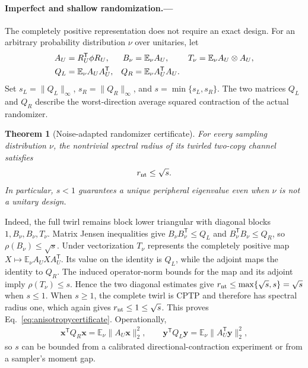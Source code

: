\documentclass[aps,prl,reprint,superscriptaddress,nofootinbib]{revtex4-2}
\newtheorem{theorem}{Theorem}
\newcommand{\E}{\mathbb{E}}
\begin{document}
\paragraph{Imperfect and shallow randomization.---}
The completely positive representation does not require an exact design.
For an arbitrary probability distribution $\nu$ over unitaries, let
\begin{align}
 A_U&=R_U^{\mathsf T}\phi R_U,&
 B_\nu&=\E_\nu A_U,&
 T_\nu&=\E_\nu A_U\otimes A_U,\notag\\
 Q_L&=\E_\nu A_UA_U^{\mathsf T},&
 Q_R&=\E_\nu A_U^{\mathsf T}A_U.
 \label{eq:arbitrarysampler}
\end{align}
Set $s_L=\lVert Q_L\rVert_\infty$, $s_R=\lVert Q_R\rVert_\infty$, and
$s=\min\{s_L,s_R\}$.  The two matrices $Q_L$ and $Q_R$ describe the
worst-direction average squared contraction of the actual randomizer.

\begin{theorem}[Noise-adapted randomizer certificate]
For every sampling distribution $\nu$, the nontrivial spectral radius of its
twirled two-copy channel satisfies
\begin{align}
 r_{\rm nt}\leq\sqrt{s}.
 \label{eq:anisotropycertificate}
\end{align}
In particular, $s<1$ guarantees a unique peripheral eigenvalue even when
$\nu$ is not a unitary design.
\end{theorem}

Indeed, the full twirl remains block lower triangular with diagonal blocks
$1,B_\nu,B_\nu,T_\nu$.  Matrix Jensen inequalities give
$B_\nu B_\nu^{\mathsf T}\leq Q_L$ and
$B_\nu^{\mathsf T}B_\nu\leq Q_R$, so
$\rho(B_\nu)\leq\sqrt{s}$.  Under vectorization $T_\nu$ represents the
completely positive map $X\mapsto\E_\nu A_UXA_U^{\mathsf T}$.  Its value on
the identity is $Q_L$, while the adjoint maps the identity to $Q_R$.
The induced operator-norm bounds for the map and its adjoint imply
$\rho(T_\nu)\leq s$.  Hence the two diagonal estimates give
$r_{\rm nt}\leq\max\{\sqrt{s},s\}=\sqrt{s}$ when $s\leq1$.
When $s\geq1$, the complete twirl is CPTP and therefore has spectral radius
one, which again gives $r_{\rm nt}\leq1\leq\sqrt{s}$.  This proves
Eq.~\eqref{eq:anisotropycertificate}.
Operationally,
\begin{align}
 \bm x^{\mathsf T}Q_R\bm x=\E_\nu\lVert A_U\bm x\rVert_2^2,
 \qquad
 \bm y^{\mathsf T}Q_L\bm y=\E_\nu\lVert A_U^{\mathsf T}\bm y\rVert_2^2,
\end{align}
so $s$ can be bounded from a calibrated directional-contraction experiment
or from a sampler's moment gap.
\end{document}
